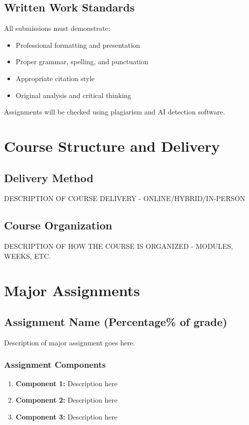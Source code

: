 \documentclass[11pt]{scrartcl} %
\begin{document}
\subsection{Written Work Standards}
All submissions must demonstrate:
\begin{itemize}
\item Professional formatting and presentation
\item Proper grammar, spelling, and punctuation
\item Appropriate citation style
\item Original analysis and critical thinking
\end{itemize}

Assignments will be checked using plagiarism and AI detection software.

\section{Course Structure and Delivery}

\subsection{Delivery Method}
DESCRIPTION OF COURSE DELIVERY - ONLINE/HYBRID/IN-PERSON

\subsection{Course Organization}
DESCRIPTION OF HOW THE COURSE IS ORGANIZED - MODULES, WEEKS, ETC.

\section{Major Assignments}

\subsection{Assignment Name (Percentage\% of grade)}
Description of major assignment goes here.

\subsubsection{Assignment Components}
\begin{enumerate}
\item \textbf{Component 1:} Description here
\item \textbf{Component 2:} Description here  
\item \textbf{Component 3:} Description here
\end{enumerate}
\end{document}
